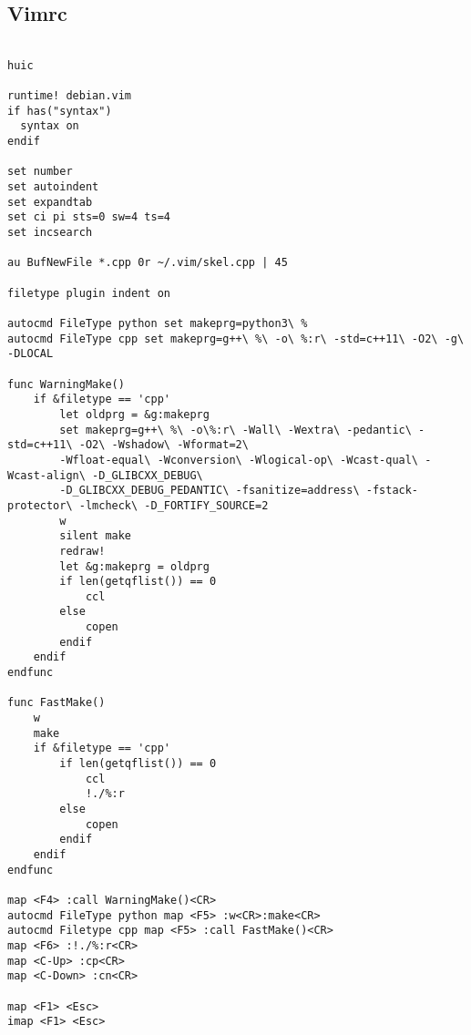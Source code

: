\subsection{Vimrc}
\begin{verbatim}

huic

runtime! debian.vim
if has("syntax")
  syntax on
endif

set number
set autoindent
set expandtab
set ci pi sts=0 sw=4 ts=4
set incsearch

au BufNewFile *.cpp 0r ~/.vim/skel.cpp | 45

filetype plugin indent on

autocmd FileType python set makeprg=python3\ %
autocmd FileType cpp set makeprg=g++\ %\ -o\ %:r\ -std=c++11\ -O2\ -g\ -DLOCAL

func WarningMake()
    if &filetype == 'cpp'
        let oldprg = &g:makeprg
        set makeprg=g++\ %\ -o\%:r\ -Wall\ -Wextra\ -pedantic\ -std=c++11\ -O2\ -Wshadow\ -Wformat=2\
        -Wfloat-equal\ -Wconversion\ -Wlogical-op\ -Wcast-qual\ -Wcast-align\ -D_GLIBCXX_DEBUG\
        -D_GLIBCXX_DEBUG_PEDANTIC\ -fsanitize=address\ -fstack-protector\ -lmcheck\ -D_FORTIFY_SOURCE=2
        w
        silent make
        redraw!
        let &g:makeprg = oldprg
        if len(getqflist()) == 0
            ccl
        else
            copen
        endif
    endif
endfunc

func FastMake()
    w
    make
    if &filetype == 'cpp'
        if len(getqflist()) == 0
            ccl
            !./%:r
        else
            copen
        endif
    endif
endfunc

map <F4> :call WarningMake()<CR>
autocmd FileType python map <F5> :w<CR>:make<CR>
autocmd Filetype cpp map <F5> :call FastMake()<CR> 
map <F6> :!./%:r<CR>
map <C-Up> :cp<CR>
map <C-Down> :cn<CR>

map <F1> <Esc>
imap <F1> <Esc>
\end{verbatim}
